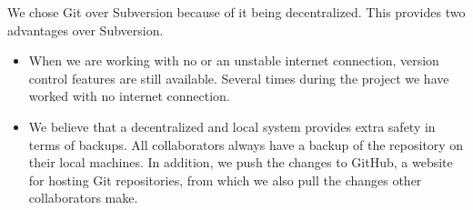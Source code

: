 We chose Git over Subversion because of it being decentralized. This provides two advantages over Subversion.

\begin{itemize}
\item When we are working with no or an unstable internet connection, version control features are still available. Several times during the project we have worked with no internet connection.
\item We believe that a decentralized and local system provides extra safety in terms of backups. All collaborators always have a backup of the repository on their local machines. In addition, we push the changes to GitHub, a website for hosting Git repositories, from which we also pull the changes other collaborators make.
\end{itemize}

